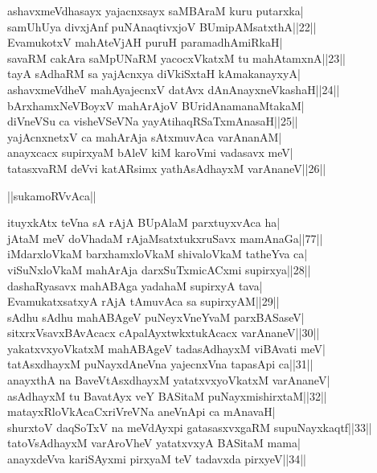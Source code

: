 \documentclass{article}
\begin{document}
ashavxmeVdhasayx yajacnxsayx saMBAraM kuru putarxka|\\
samUhUya divxjAnf puNAnaqtivxjoV BUmipAMsatxthA||22||\\
EvamukotxV mahAteVjAH puruH paramadhAmiRkaH|\\
savaRM cakAra saMpUNaRM yacocxVkatxM tu mahAtamxnA||23||\\
tayA sAdhaRM sa yajAcnxya diVkiSxtaH kAmakanayxyA|\\
ashavxmeVdheV mahAyajecnxV datAvx dAnAnayxneVkashaH||24||\\
bArxhamxNeVBoyxV mahArAjoV BUridAnamanaMtakaM|\\
diVneVSu ca visheVSeVNa yayAtihaqRSaTxmAnasaH||25||\\
yajAcnxnetxV ca mahArAja sAtxmuvAca varAnanAM|\\
anayxcacx supirxyaM bAleV kiM karoVmi vadasavx meV|\\
tatasxvaRM deVvi katARsimx yathAsAdhayxM varAnaneV||26||\\

\begin{center}
||sukamoRVvAca||
\end{center}

ituyxkAtx teVna sA rAjA BUpAlaM parxtuyxvAca ha|\\
jAtaM meV doVhadaM rAjaMsatxtukxruSavx mamAnaGa||77||\\
iMdarxloVkaM barxhamxloVkaM shivaloVkaM tatheYva ca|\\
viSuNxloVkaM mahArAja darxSuTxmicACxmi supirxya||28||\\
dashaRyasavx mahABAga yadahaM supirxyA tava|\\
EvamukatxsatxyA rAjA tAmuvAca sa supirxyAM||29||\\
sAdhu sAdhu mahABAgeV puNeyxVneYvaM parxBASaseV|\\
sitxrxVsavxBAvAcacx cApalAyxtwkxtukAcacx varAnaneV||30||\\
yakatxvxyoVkatxM mahABAgeV tadasAdhayxM viBAvati meV|\\
tatAsxdhayxM puNayxdAneVna yajecnxVna tapasApi ca||31||\\
anayxthA na BaveVtAsxdhayxM yatatxvxyoVkatxM varAnaneV|\\
asAdhayxM tu BavatAyx veY BASitaM puNayxmishirxtaM||32||\\
matayxRloVkAcaCxriVreVNa aneVnApi ca mAnavaH|\\
shurxtoV daqSoTxV na meVdAyxpi gatasasxvxgaRM supuNayxkaqtf||33||\\
tatoVsAdhayxM varAroVheV yatatxvxyA BASitaM mama|\\
anayxdeVva kariSAyxmi pirxyaM teV tadavxda pirxyeV||34||\\
\end{document}
